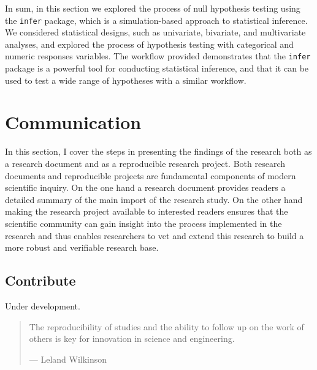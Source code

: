 \documentclass[
  letterpaper,
]{latex/krantz}
\theoremstyle{definition}
\theoremstyle{remark}
\begin{document}

In sum, in this section we explored the process of null hypothesis
testing using the \texttt{infer} package, which is a simulation-based
approach to statistical inference. We considered statistical designs,
such as univariate, bivariate, and multivariate analyses, and explored
the process of hypothesis testing with categorical and numeric responses
variables. The workflow provided demonstrates that the \texttt{infer}
package is a powerful tool for conducting statistical inference, and
that it can be used to test a wide range of hypotheses with a similar
workflow.

\part{Communication}

In this section, I cover the steps in presenting the findings of the
research both as a research document and as a reproducible research
project. Both research documents and reproducible projects are
fundamental components of modern scientific inquiry. On the one hand a
research document provides readers a detailed summary of the main import
of the research study. On the other hand making the research project
available to interested readers ensures that the scientific community
can gain insight into the process implemented in the research and thus
enables researchers to vet and extend this research to build a more
robust and verifiable research base.

\chapter{Contribute}\label{sec-contribute-chapter}

\begin{tcolorbox}[enhanced jigsaw, title=\textcolor{quarto-callout-caution-color}{\faFire}\hspace{0.5em}{Caution}, coltitle=black, toprule=.15mm, leftrule=.75mm, titlerule=0mm, opacitybacktitle=0.6, colback=white, colframe=quarto-callout-caution-color-frame, colbacktitle=quarto-callout-caution-color!10!white, opacityback=0, toptitle=1mm, arc=.35mm, rightrule=.15mm, bottomrule=.15mm, breakable, left=2mm, bottomtitle=1mm]

Under development.

\end{tcolorbox}

\begin{quote}
The reproducibility of studies and the ability to follow up on the work
of others is key for innovation in science and engineering.

--- Leland Wilkinson
\end{quote}
\end{document}
